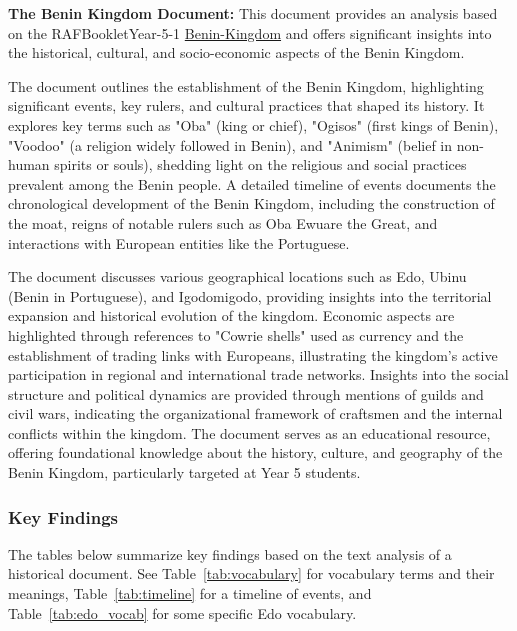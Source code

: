 \textbf{The Benin Kingdom Document:}
This document provides an analysis based on the RAFBookletYear-5-1 \href{https://denhamgreenacademy.e-act.org.uk/wp-content/uploads/sites/5/2020/10/RAFBookletYear-5-1Benin-Kingdom-paper-size-297x21-cmUPDATED.210187322-wecompress.com_.pdf}{Benin-Kingdom} and offers significant insights into the historical, cultural, and socio-economic aspects of the Benin Kingdom.

The document outlines the establishment of the Benin Kingdom, highlighting significant events, key rulers, and cultural practices that shaped its history. It explores key terms such as "Oba" (king or chief), "Ogisos" (first kings of Benin), "Voodoo" (a religion widely followed in Benin), and "Animism" (belief in non-human spirits or souls), shedding light on the religious and social practices prevalent among the Benin people. A detailed timeline of events documents the chronological development of the Benin Kingdom, including the construction of the moat, reigns of notable rulers such as Oba Ewuare the Great, and interactions with European entities like the Portuguese.

The document discusses various geographical locations such as Edo, Ubinu (Benin in Portuguese), and Igodomigodo, providing insights into the territorial expansion and historical evolution of the kingdom. Economic aspects are highlighted through references to "Cowrie shells" used as currency and the establishment of trading links with Europeans, illustrating the kingdom's active participation in regional and international trade networks. Insights into the social structure and political dynamics are provided through mentions of guilds and civil wars, indicating the organizational framework of craftsmen and the internal conflicts within the kingdom. The document serves as an educational resource, offering foundational knowledge about the history, culture, and geography of the Benin Kingdom, particularly targeted at Year 5 students.

\subsubsection{Key Findings}

The tables below summarize key findings based on the text analysis of a historical document. See Table~\ref{tab:vocabulary} for vocabulary terms and their meanings, Table~\ref{tab:timeline} for a timeline of events, and Table~\ref{tab:edo_vocab} for some specific Edo vocabulary.

